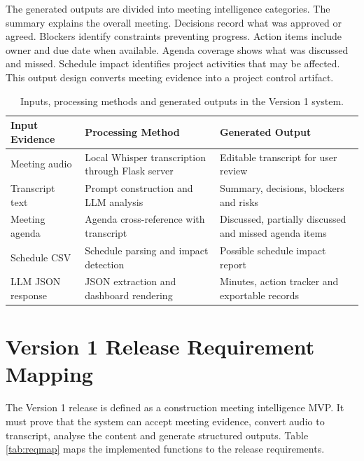 \documentclass[11pt,a4paper]{article}
\begin{document}
The generated outputs are divided into meeting intelligence categories. The summary explains the overall meeting. Decisions record what was approved or agreed. Blockers identify constraints preventing progress. Action items include owner and due date when available. Agenda coverage shows what was discussed and missed. Schedule impact identifies project activities that may be affected. This output design converts meeting evidence into a project control artifact.

\begin{table}[H]
\centering
\caption{Inputs, processing methods and generated outputs in the Version 1 system.}
\begin{tabularx}{\textwidth}{p{3.2cm}Y Y}
\toprule
\textbf{Input Evidence} & \textbf{Processing Method} & \textbf{Generated Output} \\
\midrule
Meeting audio & Local Whisper transcription through Flask server & Editable transcript for user review \\
Transcript text & Prompt construction and LLM analysis & Summary, decisions, blockers and risks \\
Meeting agenda & Agenda cross-reference with transcript & Discussed, partially discussed and missed agenda items \\
Schedule CSV & Schedule parsing and impact detection & Possible schedule impact report \\
LLM JSON response & JSON extraction and dashboard rendering & Minutes, action tracker and exportable records \\
\bottomrule
\end{tabularx}
\end{table}

\section{Version 1 Release Requirement Mapping}

The Version 1 release is defined as a construction meeting intelligence MVP. It must prove that the system can accept meeting evidence, convert audio to transcript, analyse the content and generate structured outputs. Table \ref{tab:reqmap} maps the implemented functions to the release requirements.
\end{document}
